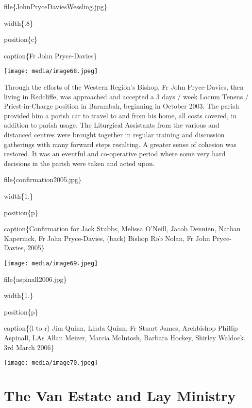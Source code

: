 file\{JohnPryceDaviesWessling.jpg\}

width\{.8\}

position\{c\}

caption\{Fr John Pryce-Davies\}

\texttt{[image: media/image68.jpeg]}

Through the efforts of the Western Region's Bishop, Fr John Pryce-Davies, then living in Redcliffe, was approached and accepted a 3 days / week Locum Tenens / Priest-in-Charge position in Barambah, beginning in October 2003. The parish provided him a parish car to travel to and from his home, all costs covered, in addition to parish usage. The Liturgical Assistants from the various and distanced centres were brought together in regular training and discussion gatherings with many forward steps resulting. A greater sense of cohesion was restored. It was an eventful and co-operative period where some very hard decisions in the parish were taken and acted upon.

file\{confirmation2005.jpg\}

width\{1.\}

position\{p\}

caption\{Confirmation for Jack Stubbs, Melissa O'Neill, Jacob Dennien, Nathan Kapernick, Fr John Pryce-Davies, (back) Bishop Rob Nolan, Fr John Pryce-Davies, 2005\}

\texttt{[image: media/image69.jpeg]}

file\{aspinall2006.jpg\}

width\{1.\}

position\{p\}

caption\{(l to r) Jim Quinn, Linda Quinn, Fr Stuart James, Archbishop Phillip Aspinall, LAs Allan Meizer, Marcia McIntosh, Barbara Hockey, Shirley Waldock. 3rd March 2006\}

\texttt{[image: media/image70.jpeg]}

\hypertarget{the-van-estate-and-lay-ministry}{%
\section{The Van Estate and Lay Ministry}\label{the-van-estate-and-lay-ministry}}

